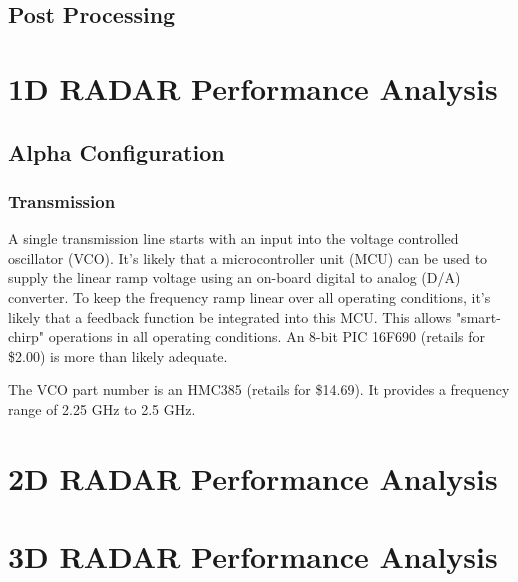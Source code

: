 \documentclass[]{article}
\begin{document}
\subsection{Post Processing}

\section{1D RADAR Performance Analysis}

\subsection{Alpha Configuration}

\subsubsection{Transmission}
A single transmission line starts with an input into the voltage controlled oscillator (VCO). It's likely that a microcontroller unit (MCU) can be used to supply the linear ramp voltage using an on-board digital to analog (D/A) converter. To keep the frequency ramp linear over all operating conditions, it's likely that a feedback function be integrated into this MCU. This allows "smart-chirp" operations in all operating conditions. An 8-bit PIC 16F690 (retails for \$2.00) is more than likely adequate.

The VCO part number is an HMC385 (retails for \$14.69). It provides a frequency range of 2.25 GHz to 2.5 GHz.


\section{2D RADAR Performance Analysis}

\section{3D RADAR Performance Analysis}
\end{document}
